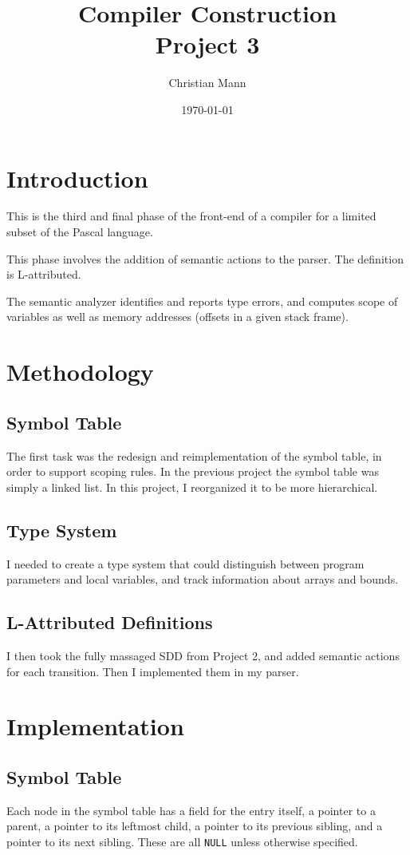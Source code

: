 \documentclass[titlepage]{article}
\author{Christian Mann}
\title{Compiler Construction \\ Project 3}
\date{\today}
\begin{document}
	\maketitle
	\tableofcontents
	\section{Introduction}
	This is the third and final phase of the front-end of a compiler for a limited subset of the Pascal language.

	This phase involves the addition of semantic actions to the parser. The definition is L-attributed.

	The semantic analyzer identifies and reports type errors, and computes scope of variables as well as memory addresses (offsets in a given stack frame).
	\section{Methodology}
		\subsection{Symbol Table}
		The first task was the redesign and reimplementation of the symbol table, in order to support scoping rules. In the previous project the symbol table was simply a linked list. In this project, I reorganized it to be more hierarchical.

		\subsection{Type System}
		I needed to create a type system that could distinguish between program parameters and local variables, and track information about arrays and bounds.

		\subsection{L-Attributed Definitions}
		I then took the fully massaged SDD from Project 2, and added semantic actions for each transition. Then I implemented them in my parser.

	\section{Implementation}
		\subsection{Symbol Table}
		Each node in the symbol table has a field for the entry itself, a pointer to a parent, a pointer to its leftmost child, a pointer to its previous sibling, and a pointer to its next sibling. These are all \texttt{NULL} unless otherwise specified.
\end{document}
